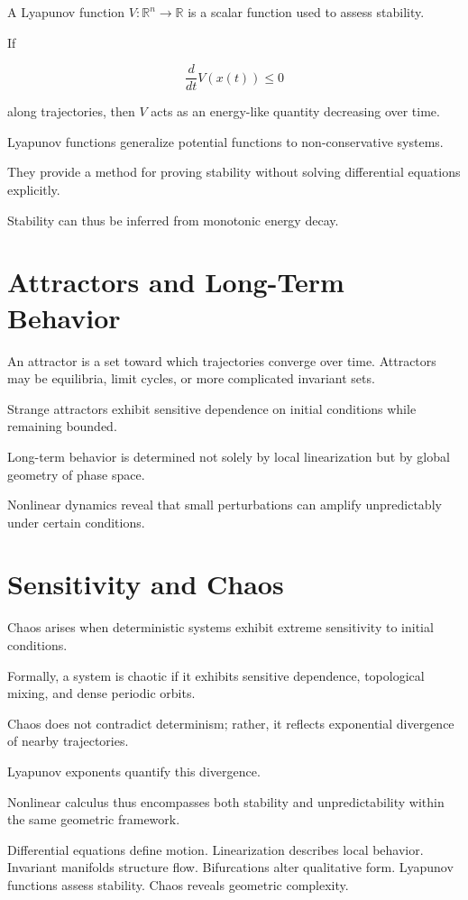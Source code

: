 \documentclass[12pt]{book}
\begin{document}
A Lyapunov function $V : \mathbb{R}^n \to \mathbb{R}$ is a scalar function used to assess stability.

If

\[
\frac{d}{dt} V(x(t)) \le 0
\]

along trajectories, then $V$ acts as an energy-like quantity decreasing over time.

Lyapunov functions generalize potential functions to non-conservative systems.

They provide a method for proving stability without solving differential equations explicitly.

Stability can thus be inferred from monotonic energy decay.

\section{Attractors and Long-Term Behavior}

An attractor is a set toward which trajectories converge over time. Attractors may be equilibria, limit cycles, or more complicated invariant sets.

Strange attractors exhibit sensitive dependence on initial conditions while remaining bounded.

Long-term behavior is determined not solely by local linearization but by global geometry of phase space.

Nonlinear dynamics reveal that small perturbations can amplify unpredictably under certain conditions.

\section{Sensitivity and Chaos}

Chaos arises when deterministic systems exhibit extreme sensitivity to initial conditions.

Formally, a system is chaotic if it exhibits sensitive dependence, topological mixing, and dense periodic orbits.

Chaos does not contradict determinism; rather, it reflects exponential divergence of nearby trajectories.

Lyapunov exponents quantify this divergence.

Nonlinear calculus thus encompasses both stability and unpredictability within the same geometric framework.

Differential equations define motion. Linearization describes local behavior. Invariant manifolds structure flow. Bifurcations alter qualitative form. Lyapunov functions assess stability. Chaos reveals geometric complexity.
\end{document}
